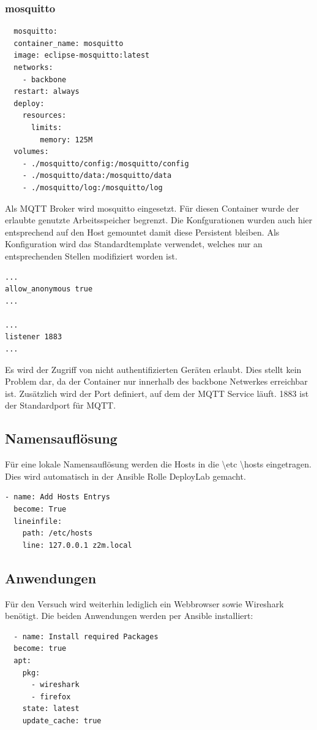 \subsubsection{mosquitto}

\begin{lstlisting}
  mosquitto:
  container_name: mosquitto
  image: eclipse-mosquitto:latest
  networks:
    - backbone
  restart: always
  deploy:
    resources:
      limits:
        memory: 125M
  volumes:
    - ./mosquitto/config:/mosquitto/config
    - ./mosquitto/data:/mosquitto/data
    - ./mosquitto/log:/mosquitto/log
\end{lstlisting}

Als MQTT Broker wird \grqq mosquitto \grqq{} eingesetzt. Für diesen Container wurde der erlaubte genutzte Arbeitsspeicher begrenzt. Die Konfgurationen 
wurden auch hier entsprechend auf den Host gemountet damit diese Persistent bleiben. Als Konfiguration wird das Standardtemplate verwendet, welches nur an 
entsprechenden Stellen modifiziert worden ist.

\begin{lstlisting}
... 
allow_anonymous true
... 

... 
listener 1883
... 
\end{lstlisting}

Es wird der Zugriff von nicht authentifizierten Geräten erlaubt. Dies stellt kein Problem dar, da der Container nur innerhalb des \grqq backbone \grqq{} 
Netwerkes erreichbar ist. Zusätzlich wird der Port definiert, auf dem der MQTT Service läuft. 1883 ist der Standardport für MQTT.

\subsection{Namensauflösung}

Für eine lokale Namensauflösung werden die Hosts in die \grqq \textbackslash etc \textbackslash hosts \grqq{} eingetragen. Dies wird automatisch in der Ansible
Rolle \grqq DeployLab \grqq{} gemacht.

\begin{lstlisting}
- name: Add Hosts Entrys
  become: True
  lineinfile:
    path: /etc/hosts
    line: 127.0.0.1 z2m.local
\end{lstlisting}

\subsection{Anwendungen}

Für den Versuch wird weiterhin lediglich ein Webbrowser sowie Wireshark benötigt. Die beiden Anwendungen werden per Ansible installiert:
\begin{lstlisting}
  - name: Install required Packages
  become: true
  apt:
    pkg:
      - wireshark
      - firefox
    state: latest
    update_cache: true
\end{lstlisting}

